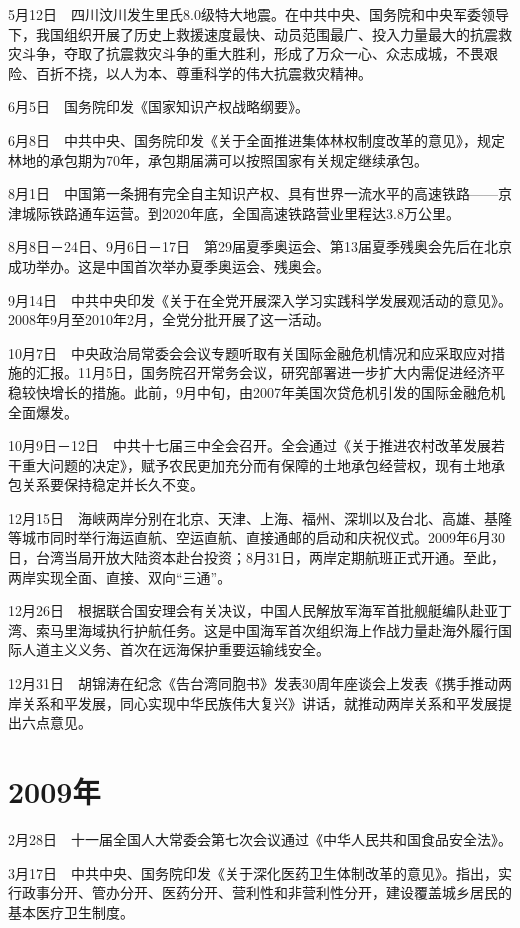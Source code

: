 \documentclass[10pt,a4paper,twocolumn]{book}
\begin{document}
5月12日　四川汶川发生里氏8.0级特大地震。在中共中央、国务院和中央军委领导下，我国组织开展了历史上救援速度最快、动员范围最广、投入力量最大的抗震救灾斗争，夺取了抗震救灾斗争的重大胜利，形成了万众一心、众志成城，不畏艰险、百折不挠，以人为本、尊重科学的伟大抗震救灾精神。

6月5日　国务院印发《国家知识产权战略纲要》。

6月8日　中共中央、国务院印发《关于全面推进集体林权制度改革的意见》，规定林地的承包期为70年，承包期届满可以按照国家有关规定继续承包。

8月1日　中国第一条拥有完全自主知识产权、具有世界一流水平的高速铁路——京津城际铁路通车运营。到2020年底，全国高速铁路营业里程达3.8万公里。

8月8日－24日、9月6日－17日　第29届夏季奥运会、第13届夏季残奥会先后在北京成功举办。这是中国首次举办夏季奥运会、残奥会。

9月14日　中共中央印发《关于在全党开展深入学习实践科学发展观活动的意见》。2008年9月至2010年2月，全党分批开展了这一活动。

10月7日　中央政治局常委会会议专题听取有关国际金融危机情况和应采取应对措施的汇报。11月5日，国务院召开常务会议，研究部署进一步扩大内需促进经济平稳较快增长的措施。此前，9月中旬，由2007年美国次贷危机引发的国际金融危机全面爆发。

10月9日－12日　中共十七届三中全会召开。全会通过《关于推进农村改革发展若干重大问题的决定》，赋予农民更加充分而有保障的土地承包经营权，现有土地承包关系要保持稳定并长久不变。

12月15日　海峡两岸分别在北京、天津、上海、福州、深圳以及台北、高雄、基隆等城市同时举行海运直航、空运直航、直接通邮的启动和庆祝仪式。2009年6月30日，台湾当局开放大陆资本赴台投资；8月31日，两岸定期航班正式开通。至此，两岸实现全面、直接、双向“三通”。

12月26日　根据联合国安理会有关决议，中国人民解放军海军首批舰艇编队赴亚丁湾、索马里海域执行护航任务。这是中国海军首次组织海上作战力量赴海外履行国际人道主义义务、首次在远海保护重要运输线安全。

12月31日　胡锦涛在纪念《告台湾同胞书》发表30周年座谈会上发表《携手推动两岸关系和平发展，同心实现中华民族伟大复兴》讲话，就推动两岸关系和平发展提出六点意见。

\section{2009年}

2月28日　十一届全国人大常委会第七次会议通过《中华人民共和国食品安全法》。

3月17日　中共中央、国务院印发《关于深化医药卫生体制改革的意见》。指出，实行政事分开、管办分开、医药分开、营利性和非营利性分开，建设覆盖城乡居民的基本医疗卫生制度。
\end{document}
